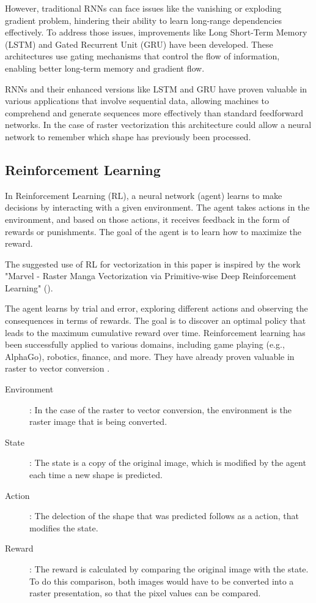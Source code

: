 \documentclass[12pt, a4paper, titlepage]{report}
\begin{document}
However, traditional RNNs can face issues like the vanishing or exploding gradient problem, hindering their ability to learn long-range dependencies effectively.
To address those issues, improvements like Long Short-Term Memory (LSTM) and Gated Recurrent Unit (GRU) have been developed. These architectures use gating mechanisms that control the flow of information, enabling better long-term memory and gradient flow.

RNNs and their enhanced versions like LSTM and GRU have proven valuable in various applications that involve sequential data, allowing machines to comprehend and generate sequences more effectively than standard feedforward networks. In the case of raster vectorization this architecture could allow a neural network to remember which shape has previously been processed.

\subsection{Reinforcement Learning}

In Reinforcement Learning (RL), a neural network (agent) learns to make decisions by interacting with a given environment. The agent takes actions in the environment, and based on those actions, it receives feedback in the form of rewards or punishments. The goal of the agent is to learn how to maximize the reward.

The suggested use of RL for vectorization in this paper is inspired by the work "Marvel - Raster Manga Vectorization via Primitive-wise Deep Reinforcement Learning"  (\cite{su_marvel_2023}).

The agent learns by trial and error, exploring different actions and observing the consequences in terms of rewards. The goal is to discover an optimal policy that leads to the maximum cumulative reward over time. Reinforcement learning has been successfully applied to various domains, including game playing (e.g., AlphaGo), robotics, finance, and more. They have already proven valuable in raster to vector conversion \cite{su_marvel_2023}.

\begin{description}
   \item[Environment]: In the case of the raster to vector conversion, the environment is the raster image that is being converted.

   \item[State]: The state is a copy of the original image, which is modified by the agent each time a new shape is predicted.

   \item[Action]: The delection of the shape that was predicted follows as a action, that modifies the state.

   \item[Reward]: The reward is calculated by comparing the original image with the state. To do this comparison, both images would have to be converted into a raster presentation, so that the pixel values can be compared.
\end{description}
\end{document}
